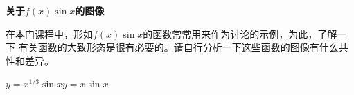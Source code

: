 \begin{shaded}
	{\bf 关于$f(x)\sin x$的图像}
	
	在本门课程中，形如$f(x)\sin x$的函数常常用来作为讨论的示例，为此，了解一下
	有关函数的大致形态是很有必要的。请自行分析一下这些函数的图像有什么共性和差异。
	\begin{center}
		\quad
		
		$y=x^{1/3}\sin x$\hspace{5cm}$y=x\sin x$
		

\end{center}
\end{shaded}
